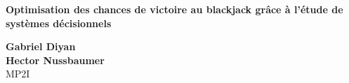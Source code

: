 \begin{titlepage}
    \begin{center}
        \vspace*{0.5cm}
        \LARGE
        \textbf{Optimisation des chances de victoire au blackjack grâce à l'étude de systèmes décisionnels}
            
        \vspace{1cm}
        \Large
        \textbf{Gabriel Diyan} \\
        \textbf{Hector Nussbaumer}\\
        MP2I\\
    \end{center}
\end{titlepage}